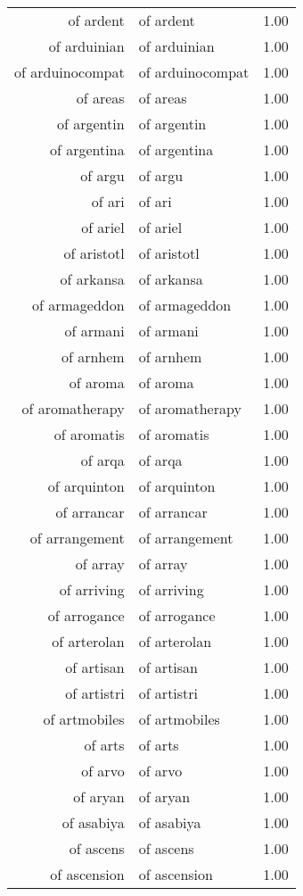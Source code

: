 \begin{table}[ht]
\begin{tabular}{rlr}
  of ardent & of ardent & 1.00 \\ 
  of arduinian & of arduinian & 1.00 \\ 
  of arduinocompat & of arduinocompat & 1.00 \\ 
  of areas & of areas & 1.00 \\ 
  of argentin & of argentin & 1.00 \\ 
  of argentina & of argentina & 1.00 \\ 
  of argu & of argu & 1.00 \\ 
  of ari & of ari & 1.00 \\ 
  of ariel & of ariel & 1.00 \\ 
  of aristotl & of aristotl & 1.00 \\ 
  of arkansa & of arkansa & 1.00 \\ 
  of armageddon & of armageddon & 1.00 \\ 
  of armani & of armani & 1.00 \\ 
  of arnhem & of arnhem & 1.00 \\ 
  of aroma & of aroma & 1.00 \\ 
  of aromatherapy & of aromatherapy & 1.00 \\ 
  of aromatis & of aromatis & 1.00 \\ 
  of arqa & of arqa & 1.00 \\ 
  of arquinton & of arquinton & 1.00 \\ 
  of arrancar & of arrancar & 1.00 \\ 
  of arrangement & of arrangement & 1.00 \\ 
  of array & of array & 1.00 \\ 
  of arriving & of arriving & 1.00 \\ 
  of arrogance & of arrogance & 1.00 \\ 
  of arterolan & of arterolan & 1.00 \\ 
  of artisan & of artisan & 1.00 \\ 
  of artistri & of artistri & 1.00 \\ 
  of artmobiles & of artmobiles & 1.00 \\ 
  of arts & of arts & 1.00 \\ 
  of arvo & of arvo & 1.00 \\ 
  of aryan & of aryan & 1.00 \\ 
  of asabiya & of asabiya & 1.00 \\ 
  of ascens & of ascens & 1.00 \\ 
  of ascension & of ascension & 1.00 \\ 

\end{tabular}
\end{table}
